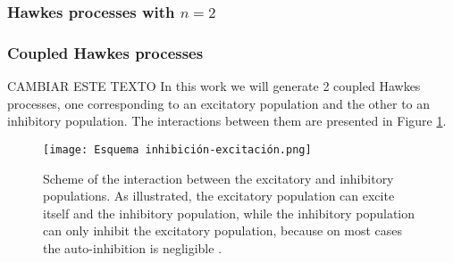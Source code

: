 \subsubsection{Hawkes processes with $n=2$} \label{subsubsec:Hawkes_processes_n_2}

\subsubsection{Coupled Hawkes processes} \label{subsubsec:Coupled_Hawkes_processes}
CAMBIAR ESTE TEXTO
In this work we will generate 2 coupled Hawkes processes, one corresponding to an excitatory population and the other to an inhibitory population. The interactions between them are
presented in Figure \ref{f: Hawkes coupled}. 

\begin{figure}[H]
\centering
\texttt{[image: Esquema inhibición-excitación.png]}
\caption{Scheme of the interaction between the excitatory and inhibitory populations. As illustrated, the excitatory population can excite itself and the inhibitory population, while the
inhibitory population can only inhibit the excitatory population, because on most cases the auto-inhibition is negligible \cite{kalle2018growing}.}
\label{f: Hawkes coupled}
\end{figure}

